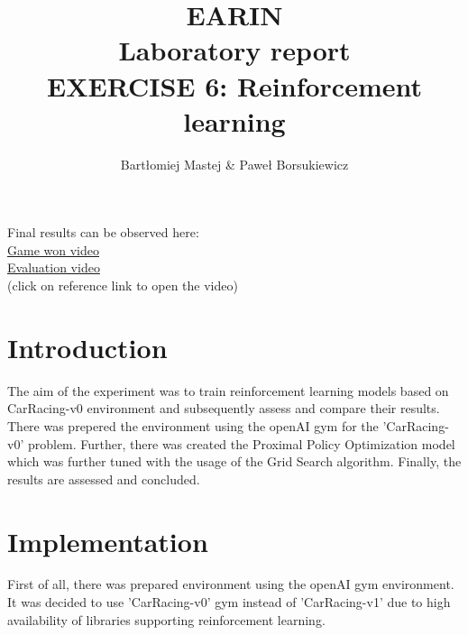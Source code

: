 \documentclass[runningheads]{llncs}
\begin{document}
%
\title{EARIN\\Laboratory report\\EXERCISE 6: Reinforcement learning}
%
\author{Bartłomiej Mastej \& Paweł Borsukiewicz}
%

%
\maketitle              %
%
%
%
%
\begin{centering}
  {\huge
    Final results can be observed here:\\
    \href{https://www.youtube.com/watch?v=ed-zkrwlk8g}{Game won video}\\
    \href{https://www.youtube.com/watch?v=Ee54wHfOUyA}{Evaluation video}\\
  }
  (click on reference link to open the video)\\
\end{centering}
\section{Introduction}
The aim of the experiment was to train reinforcement learning models based on CarRacing-v0 environment and subsequently assess and compare their results. There was prepered the environment using the openAI gym for the 'CarRacing-v0' problem. Further, there was created the Proximal Policy Optimization model which was further tuned with the usage of the Grid Search algorithm. Finally, the results are assessed and concluded.

\section{Implementation}
First of all, there was prepared environment using the openAI gym environment. It was decided to use 'CarRacing-v0' gym instead of 'CarRacing-v1' due to high availability of libraries supporting reinforcement learning.
\end{document}
